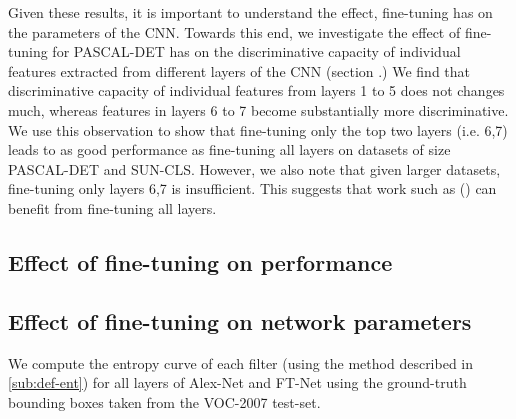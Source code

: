 Given these results, it is important to understand the effect, fine-tuning has on the parameters of the CNN. Towards this end, we investigate the effect of fine-tuning for PASCAL-DET has on the discriminative capacity of individual features extracted from different layers of the CNN (section .) We find that discriminative capacity of individual features from layers 1 to 5 does not changes much, whereas features in layers 6 to 7 become substantially more discriminative. We use this observation to show that fine-tuning only the top two layers (i.e. 6,7) leads to as good performance as fine-tuning all layers on datasets of size PASCAL-DET and SUN-CLS. However, we also note that given larger datasets, fine-tuning only layers 6,7 is insufficient. This suggests that work such as () can benefit from fine-tuning all layers.        

\subsection{Effect of fine-tuning on performance}
\label{sub:effect-finetune}
\setlength{\tabcolsep}{2pt}
\begin{table}[t!]
\begin{center}
\caption{Comparing the performance of a CNN trained from scratch, pre-trained on Imagenet and fine-tuned for the particular task. VOC 2007 + 2012 data was used for training from scratch and fine-tuning for PASCAL-DET-2. }
\label{table:fine-effect}
\end{center}
\end{table}
\setlength{\tabcolsep}{1.4pt}


\subsection{Effect of fine-tuning on network parameters}
\label{sub:fine-entropy}
We compute the entropy  curve of each filter (using the method described in \ref{sub:def-ent}) for all layers of Alex-Net and FT-Net using the ground-truth bounding boxes taken from the VOC-2007 test-set. 

